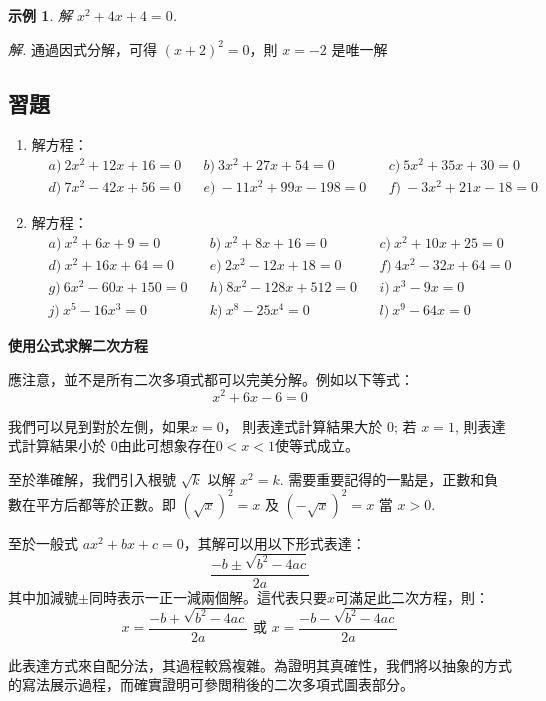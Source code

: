 \documentclass[12pt]{article}
\newtheorem{example}{示例}
\begin{document}
    \begin{example}
        解 $x^2+4x+4=0$.
    \end{example}

    \textit{ 解. }通過因式分解，可得 $(x+2)^2=0$，則 $x=-2$ 是唯一解

    \subsection*{習題}
    \begin{enumerate}
        \item 解方程：\begin{align*}
            &a)\ 2x^2+12x+16=0&&b)\ 3x^2+27x+54=0&&c)\ 5x^2+35x+30=0\\
            &d)\ 7x^2-42x+56=0&&e)\ -11x^2+99x-198=0&&f)\ -3x^2+21x-18=0
        \end{align*}
        \item 解方程：\begin{align*}
            &a)\ x^2+6x+9=0&&b)\ x^2+8x+16=0&&c)\ x^2+10x+25=0\\
            &d)\ x^2+16x+64=0&&e)\ 2x^2-12x+18=0&&f)\ 4x^2-32x+64=0\\
            &g)\ 6x^2-60x+150=0&&h)\ 8x^2-128x+512=0&&i)\ x^3-9x=0\\
            &j)\ x^5-16x^3=0&&k)\ x^8-25x^4=0&&l)\ x^9-64x=0
        \end{align*}
    \end{enumerate}

    \begin{center}
        \textbf{使用公式求解二次方程}
    \end{center}

    應注意，並不是所有二次多項式都可以完美分解。例如以下等式：$$x^2+6x-6=0$$

    我們可以見到對於左側，如果$x=0$， 則表達式計算結果大於 $0$; 若 $x=1$, 則表達式計算結果小於 $0$由此可想象存在$0<x<1$使等式成立。
    
    至於準確解，我們引入根號 $\sqrt{k}$ 以解 $x^2=k$. 需要重要記得的一點是，正數和負數在平方后都等於正數。即 $(\sqrt{x})^2=x$ 及 $(-\sqrt{x})^2=x$ 當 $x>0$.

    至於一般式 $ax^2+bx+c=0$，其解可以用以下形式表達：$$\frac{-b\pm\sqrt{b^2-4ac}}{2a}$$其中加減號$\pm$同時表示一正一減兩個解。這代表只要$x$可滿足此二次方程，則： $$x=\frac{-b+\sqrt{b^2-4ac}}{2a}\textrm{ 或 }x=\frac{-b-\sqrt{b^2-4ac}}{2a}$$ 
    
    此表達方式來自配分法，其過程較爲複雜。為證明其真確性，我們將以抽象的方式的寫法展示過程，而確實證明可參閲稍後的二次多項式圖表部分。
\end{document}
